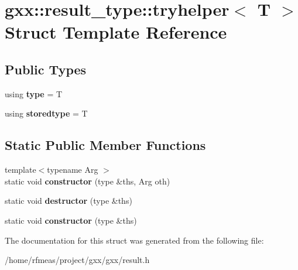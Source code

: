 \hypertarget{structgxx_1_1result__type_1_1tryhelper}{}\section{gxx\+:\+:result\+\_\+type\+:\+:tryhelper$<$ T $>$ Struct Template Reference}
\label{structgxx_1_1result__type_1_1tryhelper}
\subsection*{Public Types}
\begin{DoxyCompactItemize}
\item 
using {\bfseries type} = T\hypertarget{structgxx_1_1result__type_1_1tryhelper_a8b159799f1723c2656f1c86c6b6cd344}{}\label{structgxx_1_1result__type_1_1tryhelper_a8b159799f1723c2656f1c86c6b6cd344}

\item 
using {\bfseries storedtype} = T\hypertarget{structgxx_1_1result__type_1_1tryhelper_a0faa6e10e5e730974cc6b38792e33b37}{}\label{structgxx_1_1result__type_1_1tryhelper_a0faa6e10e5e730974cc6b38792e33b37}

\end{DoxyCompactItemize}
\subsection*{Static Public Member Functions}
\begin{DoxyCompactItemize}
\item 
{\footnotesize template$<$typename Arg $>$ }\\static void {\bfseries constructor} (type \&ths, Arg oth)\hypertarget{structgxx_1_1result__type_1_1tryhelper_a52036a0ecea71f6947bd92f6a5fe1714}{}\label{structgxx_1_1result__type_1_1tryhelper_a52036a0ecea71f6947bd92f6a5fe1714}

\item 
static void {\bfseries destructor} (type \&ths)\hypertarget{structgxx_1_1result__type_1_1tryhelper_a4d1ae063e049c59c07522a2099c27de0}{}\label{structgxx_1_1result__type_1_1tryhelper_a4d1ae063e049c59c07522a2099c27de0}

\item 
static void {\bfseries constructor} (type \&ths)\hypertarget{structgxx_1_1result__type_1_1tryhelper_a31bb82a57541de864cc7ea55c551b903}{}\label{structgxx_1_1result__type_1_1tryhelper_a31bb82a57541de864cc7ea55c551b903}

\end{DoxyCompactItemize}


The documentation for this struct was generated from the following file\+:\begin{DoxyCompactItemize}
\item 
/home/rfmeas/project/gxx/gxx/result.\+h\end{DoxyCompactItemize}
